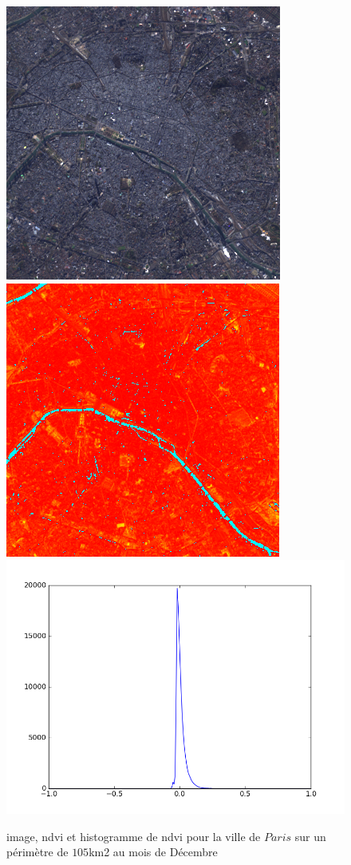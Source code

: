 \documentclass{book}
\begin{document}
\begin{figure}[H]
\begin{center}
\includegraphics[scale=0.45]{images/Paris/12_rgb.png}
\includegraphics[scale=0.45]{images/Paris/12_ndvi.png}
\includegraphics[scale=0.45]{images/Paris/12_ndvi_histo.png}
\end{center}
\caption{image, ndvi et histogramme de ndvi pour la ville de $Paris$ sur un périmètre de $105$km2 au mois de Décembre}
\label{paris_ndvi}
\end{figure}
\end{document}

